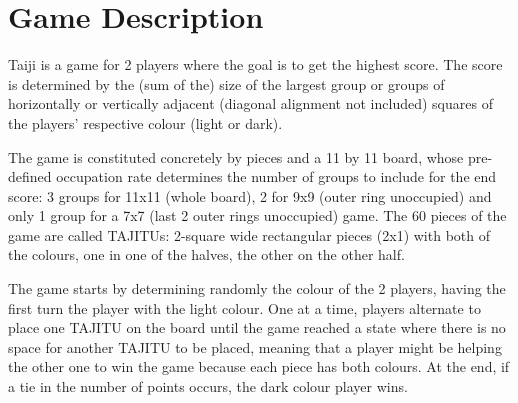 \chapter{Game Description} \label{game-description}

Taiji is a game for 2 players where the goal is to get the highest score.
The score is determined by the (sum of the) size of the largest group or groups of horizontally or vertically adjacent (diagonal alignment not included) squares of the players' respective colour (light or dark). 

The game is constituted concretely by pieces and a 11 by 11 board, whose pre-defined occupation rate determines the number of groups to include for the end score: 3 groups for 11x11 (whole board), 2 for 9x9 (outer ring unoccupied) and only 1 group for a 7x7 (last 2 outer rings unoccupied) game.
The 60 pieces of the game are called TAJITUs: 2-square wide rectangular pieces (2x1) with both of the colours, one in one of the halves, the other on the other half.

The game starts by determining randomly the colour of the 2 players, having the first turn the player with the light colour. One at a time, players alternate to place one TAJITU on the board until the game reached a state where there is no space for another TAJITU to be placed, meaning that a player might be helping the other one to win the game because each piece has both colours.
At the end, if a tie in the number of points occurs, the dark colour player wins.

